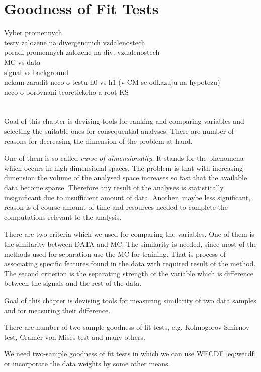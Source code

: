\chapter{Goodness of Fit Tests}
\label{ch:GoF}

Vyber promennych \\
testy zalozene na divergencnich vzdalenostech \\
poradi promennych zalozene na div. vzdalenostech\\
 MC vs data\\
signal vs background \\
nekam zaradit neco o testu h0 vs h1 (v CM se odkazuju na hypotezu) \\
neco o porovnani teoretickeho a root KS \\
\\
\\


\noindent Goal of this chapter is devising tools for ranking and comparing variables and selecting the suitable ones for consequential analyses. There are number of reasons for decreasing the dimension of the problem at hand. 

One of them is so called {\em curse of dimensionality}. It stands for the phenomena which occurs in high-dimensional spaces. The problem is that with increasing dimension the volume of the analysed space increases so fast that the available data become sparse. Therefore any result of the analyses is statistically insignificant due to insufficient amount of data. Another, maybe less significant, reason is of course amount of time and resources needed to complete the computations relevant to the analysis. 

There are two criteria which we used for comparing the variables. One of them is the similarity between DATA and MC. The similarity is needed, since most of the methods used for separation use the MC for training. That is process of associating specific features found in the data with required result of the method. The second criterion is the separating strength of the variable which is difference between the signals and the rest of the data.

\noindent Goal of this chapter is devising tools for measuring similarity of two data samples and for measuring their difference. 


There are number of two-sample goodness of fit  tests, e.g. Kolmogorov-Smirnov test, Cram\'{e}r-von Mises test and many others. 

We need two-sample goodness of fit  tests in which we can use WECDF \eqref{eq:wecdf} or incorporate the data weights by some other means.

